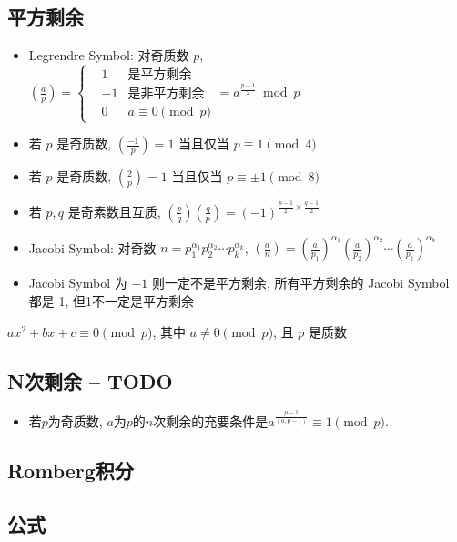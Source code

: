 \documentclass[landscape, twocolumn, 8pt, a4paper, twoside]{extarticle}
\begin{document}
  \subsection{平方剩余}
    \begin{itemize}
    \item Legrendre Symbol: 对奇质数 $p$, $(\frac{a}{p}) =
      \left\{
      \begin{aligned}
      &  1 & \textrm{是平方剩余} \\
      & -1 & \textrm{是非平方剩余} \\
      &  0 & \textrm{$a \equiv 0 \pmod{p}$}
      \end{aligned}
      \right.
      = a^{\frac{p - 1}{2}} \bmod{p} $
    \item 若 $p$ 是奇质数, $(\frac{-1}{p}) = 1$ 当且仅当 $p \equiv 1 \pmod{4}$
    \item 若 $p$ 是奇质数, $(\frac{ 2}{p}) = 1$ 当且仅当 $p \equiv \pm 1 \pmod{8}$
    \item 若 $p, q$ 是奇素数且互质, $(\frac{p}{q})(\frac{q}{p}) = (-1)^{\frac{p - 1}{2} \times \frac{q - 1}{2}}$
    \item Jacobi Symbol: 对奇数 $n = p_1^{\alpha_1} p_2^{\alpha_2} \cdots p_k ^ {\alpha_k} $, 
                         $(\frac{a}{n}) = (\frac{a}{p_1})^{\alpha_1} (\frac{a}{p_2})^{\alpha_2} \cdots (\frac{a}{p_k})^{\alpha_k}$
    \item Jacobi Symbol 为 $-1$ 则一定不是平方剩余, 所有平方剩余的 Jacobi Symbol 都是 1, 但1不一定是平方剩余
    \end{itemize}

    $ax^2 + bx + c \equiv 0 \pmod{p}$, 其中 $a \ne 0 \pmod{p}$, 且 $p$ 是质数
    
  
  \subsection{N次剩余 -- TODO}
    \begin{itemize}
    \item 若$p$为奇质数, $a$为$p$的$n$次剩余的充要条件是$a^{\frac{p - 1}{(a, p - 1)}} \equiv 1 \pmod{p}$.
    \end{itemize}

  \subsection{Romberg积分}
    

  \subsection{公式}
\end{document}
